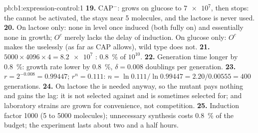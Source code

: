 \begin{solution}{pb:b1:expression-control:1}
\textbf{19.} CAP$^-$: grows on glucose to $\num{7e7}$, then stops: the
 cannot be activated, the  stays near 5 molecules, and
the lactose is never used.
\textbf{20.} On lactose only: none in  level once induced (both
fully on) and essentially none in growth; $O^c$ merely lacks the
delay of induction. On glucose only: $O^c$ makes the  uselessly
(as far as CAP allows), wild type does not.
\textbf{21.} $5000\times 4096\times 4 = \num{8.2e7}$ : \qty{0.8}{\%}
of $10^{10}$.
\textbf{22.} Generation time longer by \qty{0.8}{\%}: growth rate
lower by \qty{0.8}{\%}, $\delta = 0.008$ doublings per generation.
\textbf{23.} $r = 2^{-0.008} = 0.99447$; $r^n = 0.111$: $n =
\ln 0.111/\ln 0.99447 = 2.20/0.00555 = 400$ generations.
\textbf{24.} On lactose the  is needed anyway, so the mutant
pays nothing and gains the lag: it is not selected against and is
sometimes selected for; and laboratory strains are grown for
convenience, not competition.
\textbf{25.} Induction factor 1000 (5 to \num{5000} molecules);
unnecessary synthesis costs \qty{0.8}{\%} of the  budget; the
experiment lasts about two and a half hours.
\end{solution}
